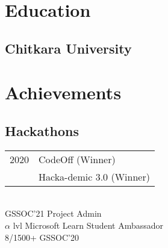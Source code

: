 \documentclass[]{deedy-resume-reversed}
\begin{document}
\begin{minipage}[t]{0.35\textwidth}

\section{Education}

\subsection{Chitkara University}
\sectionsep





\section{Achievements}
\subsection{Hackathons}
\begin{tabular}{ll}
2020 &  CodeOff (Winner)\\
 & Hacka-demic 3.0 (Winner)\\
\end{tabular}
\sectionsep
\\
GSSOC'21 Project Admin \\
$\alpha$ lvl  Microsoft Learn Student Ambassador\\
8/1500+ GSSOC'20\\


\end{minipage}
\end{document}
